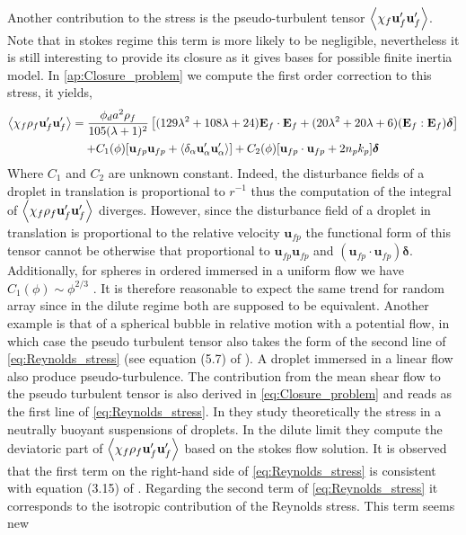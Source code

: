 Another contribution to the stress is the pseudo-turbulent tensor $\left<\chi_f \textbf{u}_f'\textbf{u}_f'\right>$. 
Note that in stokes regime this term is more likely to be negligible, nevertheless it is still interesting to provide its closure as it gives bases for possible finite inertia model. 
In \ref{ap:Closure_problem} we compute the first order correction to this stress, it yields, 
\begin{multline}
    \left<\chi_f \rho_f \textbf{u}_f' \textbf{u}_f'\right>
    =
    \frac{\phi_d a^2 \rho_f}{105 (\lambda +1)^2 }\left[
        (129\lambda^2+108\lambda+24)\textbf{E}_f\cdot \textbf{E}_f
        + (20\lambda^2 +20\lambda + 6)
        (\textbf{E}_f : \textbf{E}_f)\bm\delta
    \right]\\
    + C_1(\phi) [\textbf{u}_{fp} \textbf{u}_{fp}
    + \left<\delta_\alpha \textbf{u}_\alpha'\textbf{u}_\alpha'\right> ]
    + C_2(\phi) [\textbf{u}_{fp}\cdot \textbf{u}_{fp} + 2 n_p k_p]\bm\delta
    \label{eq:Reynolds_stress}
\end{multline}
Where $C_1$ and $C_2$ are unknown constant.
Indeed, the disturbance fields of a droplet in translation is proportional to $r^{-1}$ thus the computation of the integral of $\left<\chi_f \rho_f \textbf{u}_f' \textbf{u}_f'\right>$ diverges. 
However, since the disturbance field of a droplet in translation is proportional to the relative velocity $\textbf{u}_{fp}$ the functional form of this tensor cannot be otherwise that proportional to $\textbf{u}_{fp} \textbf{u}_{fp}$ and $(\textbf{u}_{fp}\cdot \textbf{u}_{fp})\bm\delta$.
Additionally, for spheres in ordered immersed in a uniform flow we have $C_1(\phi) \sim \phi^{2/3}$ \citet{hill2001first}.
It is therefore reasonable to expect the same trend for random array since in the dilute regime both are supposed to be equivalent. 
Another example is that of a spherical bubble in relative motion with a potential flow, in which case the pseudo turbulent tensor also takes the form of the second line of \ref{eq:Reynolds_stress} (see equation (5.7) of \citet{zhang1994ensemble}). 
A droplet immersed in a linear flow also produce pseudo-turbulence. 
The contribution from the mean shear flow to the pseudo turbulent tensor is also derived in \ref{eq:Closure_problem} and reads as the first line of \ref{eq:Reynolds_stress}. 
In  \citet{raja2010inertial} they study theoretically the stress in a neutrally buoyant suspensions of droplets. 
In the dilute limit they compute the deviatoric part of $\left<\chi_f \rho_f \textbf{u}_f' \textbf{u}_f'\right>$ based on the stokes flow solution. 
It is observed that the first term on the right-hand side of \ref{eq:Reynolds_stress} is consistent with equation (3.15) of \citet{raja2010inertial}.
Regarding the second term of \ref{eq:Reynolds_stress} it corresponds to the  isotropic contribution of the Reynolds stress.
This term seems new  


